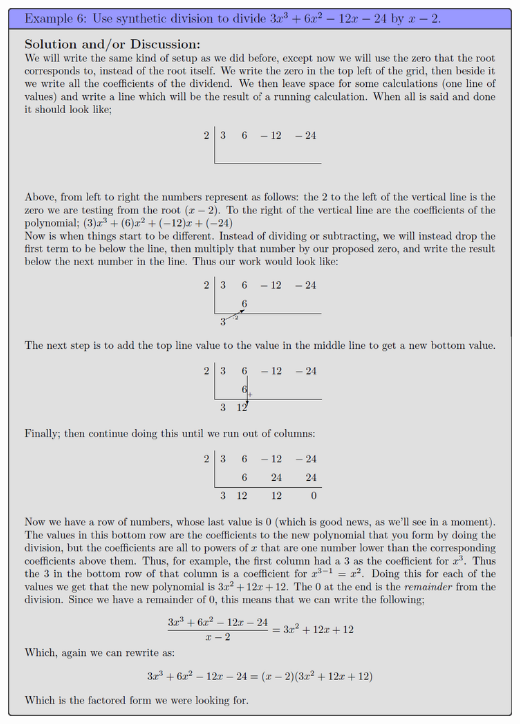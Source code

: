 \documentclass{ximera}
\begin{document}
\begin{image}
    \includegraphics[width=\textwidth]{exPolySyntheticDivision.png}
\end{image}%
\end{document}
